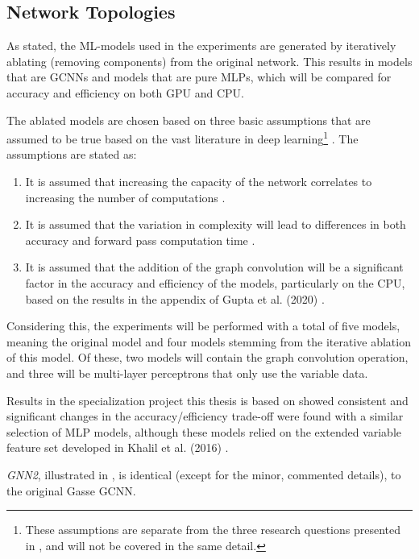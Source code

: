 \subsection{Network Topologies}

As stated, the \gls{ML}-models used in the experiments are generated by iteratively ablating (removing components) from the original network. This results in models that are \gls{GCNN}s and models that are pure \gls{MLP}s, which will be compared for accuracy and efficiency on both \gls{GPU} and \gls{CPU}. 

The ablated models are chosen based on three basic assumptions that are assumed to be true based on the vast literature in deep learning\footnote{These assumptions are separate from the three research questions presented in , and will not be covered in the same detail.} \cite{goodfellow2016deep}. The assumptions are stated as: 


\begin{enumerate}[label=(\roman*)]
    \item  It is assumed that increasing the capacity of the network correlates to increasing the number of computations \cite{goodfellow2016deep}. 
    \item  It is assumed that the variation in complexity will lead to differences in both accuracy and forward pass computation time \cite{goodfellow2016deep}. 
    \item  It is  assumed that the addition of the graph convolution will be a significant factor in the accuracy and efficiency of the models, particularly on the \gls{CPU}, based on the results in the appendix of Gupta et al. (2020) \cite{gupta2020hybrid}.
\end{enumerate}

Considering this, the experiments will be performed with a total of five models, meaning the original model and four models stemming from the iterative ablation of this model. Of these, two models will contain the graph convolution operation, and three will be multi-layer perceptrons that only use the variable data. 

Results in the specialization project this thesis is based on showed consistent and significant changes in the accuracy/efficiency trade-off were found with a similar selection of \gls{MLP} models, although these models relied on the extended variable feature set developed in Khalil et al. (2016) \cite{khalil2016learning}.

\textit{GNN2}, illustrated in , is identical (except for the minor, commented details), to the original Gasse \gls{GCNN}.  

